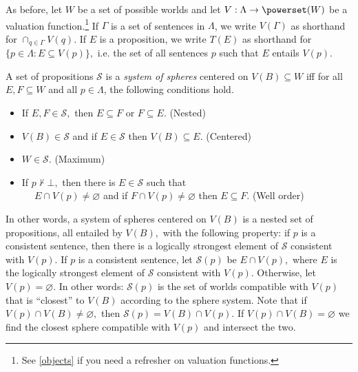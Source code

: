 As before, let $W$ be a set of possible worlds and let $V:\Lambda \rightarrow
\powerset(W)$ be a valuation function.\footnote{See \autoref{objects} if you
need a refresher on valuation functions.} If $\Gamma$ is a set of sentences in
$\Lambda$, we write $V(\Gamma)$ as shorthand for $\cap_{q\in \Gamma} V(q).$ If
$E$ is a proposition, we write $T(E)$ as shorthand for $\{ p \in \Lambda :
E\subseteq V(p) \},$ i.e. the set of all sentences $p$ such that $E$ entails
$V(p).$ 

A set of propositions $\mathcal{S}$ is a {\em system of spheres} centered on
$V(B)\subseteq W$ iff for all $E,F\subseteq W$ and all $p\in \Lambda$, the
following conditions hold.
\begin{itemize}
\item[] If $E,F\in \mathcal{S},$ then $E\subseteq F$ or $F\subseteq E$.
\hfill(Nested)
\item[] $V(B)\in \mathcal{S}$ and if $E\in\mathcal{S}$ then $V(B)\subseteq E$.
\hfill(Centered)
\item[] $W\in\mathcal{S}$. \hfill(Maximum)
\item[] If $p\nvdash \bot,$ then there is $E\in \mathcal{S}$ such that\\
  $\phantom{M}$\hspace{1em} $E\cap V(p)\neq \varnothing$ and if $F\cap V(p)\neq
  \varnothing$ then $E\subseteq F$. \hfill(Well order)
\end{itemize}
In other words, a system of spheres centered on $V(B)$ is a nested set of
propositions, all entailed by $V(B),$ with the following property: if $p$ is a
consistent sentence, then there is a logically strongest element of
$\mathcal{S}$ consistent with $V(p)$. If $p$ is a consistent sentence, let
$\mathcal{S}(p)$ be $E\cap V(p),$ where $E$ is the logically strongest element
of $\mathcal{S}$ consistent with $V(p)$. Otherwise, let $V(p)=\varnothing$. In
other words: $\mathcal{S}(p)$ is the set of worlds compatible with $V(p)$ that
is ``closest'' to $V(B)$ according to the sphere system. Note that if $V(p) \cap
V(B)\neq \varnothing,$ then $\mathcal{S}(p)=V(B)\cap V(p).$ If $V(p)\cap V(B) =
\varnothing$ we find the closest sphere compatible with $V(p)$ and intersect the
two.
